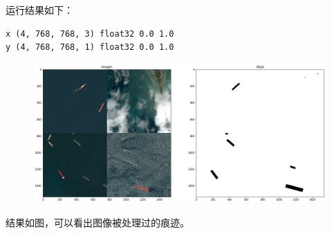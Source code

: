运行结果如下：

\begin{verbatim}
x (4, 768, 768, 3) float32 0.0 1.0
y (4, 768, 768, 1) float32 0.0 1.0
\end{verbatim}

\begin{figure}
\centering
\includegraphics{preprocessing_pic/7.png}
\caption{}
\end{figure}

结果如图，可以看出图像被处理过的痕迹。
